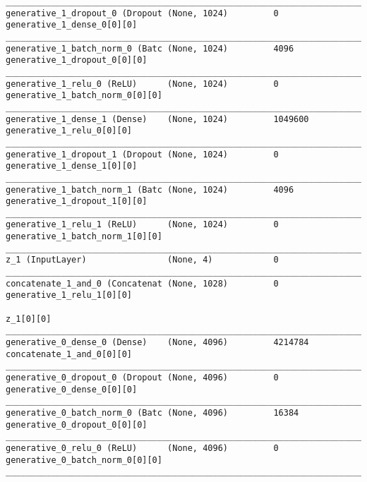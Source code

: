\begin{lstlisting}[caption={dSprites-VLAE Decoder},captionpos=b,basicstyle=\tiny, label={lst:dsprites-vlae-decoder}]
__________________________________________________________________________________________________
generative_1_dropout_0 (Dropout (None, 1024)         0           generative_1_dense_0[0][0]
__________________________________________________________________________________________________
generative_1_batch_norm_0 (Batc (None, 1024)         4096        generative_1_dropout_0[0][0]
__________________________________________________________________________________________________
generative_1_relu_0 (ReLU)      (None, 1024)         0           generative_1_batch_norm_0[0][0]
__________________________________________________________________________________________________
generative_1_dense_1 (Dense)    (None, 1024)         1049600     generative_1_relu_0[0][0]
__________________________________________________________________________________________________
generative_1_dropout_1 (Dropout (None, 1024)         0           generative_1_dense_1[0][0]
__________________________________________________________________________________________________
generative_1_batch_norm_1 (Batc (None, 1024)         4096        generative_1_dropout_1[0][0]
__________________________________________________________________________________________________
generative_1_relu_1 (ReLU)      (None, 1024)         0           generative_1_batch_norm_1[0][0]
__________________________________________________________________________________________________
z_1 (InputLayer)                (None, 4)            0
__________________________________________________________________________________________________
concatenate_1_and_0 (Concatenat (None, 1028)         0           generative_1_relu_1[0][0]
                                                                 z_1[0][0]
__________________________________________________________________________________________________
generative_0_dense_0 (Dense)    (None, 4096)         4214784     concatenate_1_and_0[0][0]
__________________________________________________________________________________________________
generative_0_dropout_0 (Dropout (None, 4096)         0           generative_0_dense_0[0][0]
__________________________________________________________________________________________________
generative_0_batch_norm_0 (Batc (None, 4096)         16384       generative_0_dropout_0[0][0]
__________________________________________________________________________________________________
generative_0_relu_0 (ReLU)      (None, 4096)         0           generative_0_batch_norm_0[0][0]
__________________________________________________________________________________________________

\end{lstlisting}
